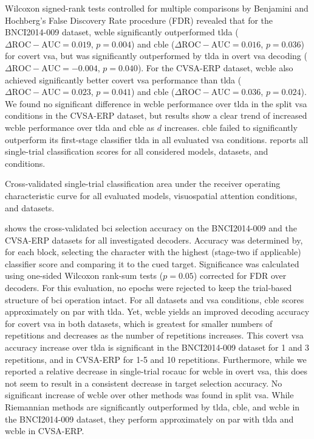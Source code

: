 Wilcoxon signed-rank tests controlled for multiple comparisons by Benjamini
and Hochberg's False Discovery Rate procedure (FDR) revealed that
for the BNCI2014-009 dataset, \ac{wcble} significantly outperformed \ac{tlda}
($\Delta\mathrm{ROC-AUC} = 0.019$, $p=0.004$) and \ac{cble}
($\Delta\mathrm{ROC-AUC} = 0.016$, $p=0.036$) for covert \ac{vsa},
but was significantly outperformed by \ac{tlda} in overt \ac{vsa} decoding
($\Delta\mathrm{ROC-AUC}=-0.004$, $p=0.040$).
For the CVSA-ERP dataset, \ac{wcble}
also achieved significantly better covert \ac{vsa} performance than \ac{tlda} ($\Delta\mathrm{ROC-AUC}
	= 0.023$, $p=0.041$) and \ac{cble} ($\Delta\mathrm{ROC-AUC}
	= 0.036$, $p=0.024$).
We found no significant difference in \ac{wcble} performance over \ac{tlda} in the split
\ac{vsa} conditions in the CVSA-ERP dataset, but results show a clear trend of
increased \ac{wcble} performance over \ac{tlda} and \ac{cble} as $d$ increases.
\ac{cble} failed to significantly outperform its first-stage classifier \ac{tlda} in all
evaluated \ac{vsa} conditions.
 reports all single-trial classification scores for all considered models, datasets,
and conditions.

\begin{table}
  \centering
  \makebox[\textwidth][c]{%
    
  }
  \caption{Cross-validated single-trial classification area under the receiver operating characteristic
curve for all evaluated models, visuospatial attention conditions, and
  datasets.}
  \label{tab:covert-align/results/single-trial}
\end{table}


 shows the cross-validated \ac{bci} selection
accuracy on the BNCI2014-009 and the CVSA-ERP datasets for all investigated
decoders.
Accuracy was determined by, for each block, selecting the character with the
highest (stage-two if applicable) classifier score and comparing it to the cued target.
Significance was calculated using one-sided Wilcoxon rank-sum tests ($p=0.05$)
corrected for FDR over decoders.
For this evaluation, no epochs were rejected to keep the trial-based structure
of \ac{bci} operation intact.
For all datasets and \ac{vsa} conditions, \ac{cble} scores approximately on par with \ac{tlda}.
Yet, \ac{wcble} yields an improved decoding accuracy for covert \ac{vsa} in both
datasets, which is greatest for smaller numbers of repetitions and
decreases as the number of repetitions increases.
This covert \ac{vsa} accuracy increase over \ac{tlda} is significant in the
BNCI2014-009 dataset for 1 and 3 repetitions, and in CVSA-ERP for 1-5 and 10 repetitions.
Furthermore, while we reported a relative decrease in single-trial \ac{rocauc} for
\ac{wcble} in overt \ac{vsa}, this does not seem to result in a consistent decrease in target
selection accuracy.
No significant increase of \ac{wcble} over other methods was found in split \ac{vsa}.
While Riemannian methods are significantly outperformed by \ac{tlda}, \ac{cble}, and \ac{wcble}
in the BNCI2014-009 dataset, they perform approximately on par with \ac{tlda} and
\ac{wcble} in CVSA-ERP.

